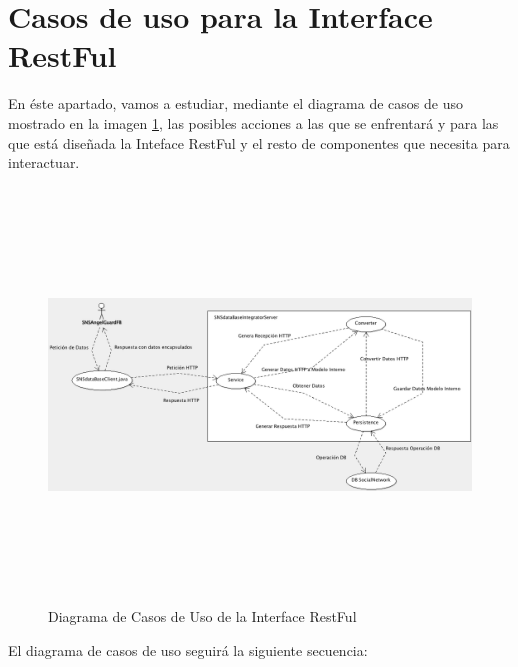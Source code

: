 \section{Casos de uso para la Interface RestFul}
En éste apartado, vamos a estudiar, mediante el diagrama de casos de uso mostrado en la imagen \ref{imgCasosUsoRestFul}, las posibles acciones a las que se enfrentará y para las que está diseñada la Inteface RestFul y el resto de componentes que necesita para interactuar.
\begin{figure}[h]
\begin{center}
\includegraphics[width=17cm,height=11cm]{Figuras/imgCasosUsoRestFul.png}
\end{center}
\caption{\label{imgCasosUsoRestFul} Diagrama de Casos de Uso de la Interface RestFul}
\end{figure}
\bigskip
\par
El diagrama de casos de uso seguirá la siguiente secuencia:
